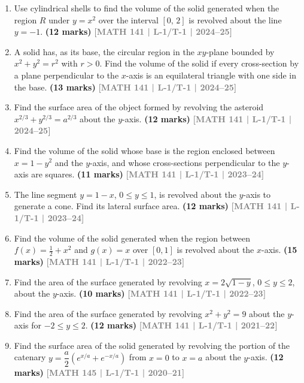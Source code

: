 \documentclass[12pt,a3paper]{article}
\newcommand{\yr}[1]{\hfill\textcolor{gray}{\small\textbf{[#1]}}}
\newcommand{\mk}[1]{\textcolor{orange!70!black}{\small\textbf{(#1 marks)}}}
\begin{document}
\begin{enumerate}

\item Use cylindrical shells to find the volume of the solid generated when the region $R$ under $y=x^{2}$ over the interval $[0,\,2]$ is revolved about the line $y=-1$. 
\mk{12} \yr{MATH 141 | L-1/T-1 | 2024--25}

\item A solid has, as its base, the circular region in the $xy$-plane bounded by $x^{2}+y^{2}=r^{2}$ with $r>0$. Find the volume of the solid if every cross-section by a plane perpendicular to the $x$-axis is an equilateral triangle with one side in the base.
\mk{13}  \yr{MATH 141 | L-1/T-1 | 2024--25}  

\item Find the surface area of the object formed by revolving the asteroid $x^{2/3}+y^{2/3}=a^{2/3}$ about the $y$-axis. 
\mk{12} \yr{MATH 141 | L-1/T-1 | 2024--25}

\item Find the volume of the solid whose base is the region enclosed between $x=1-y^{2}$ and the $y$-axis, and whose cross-sections perpendicular to the $y$-axis are squares.
\mk{11} \yr{MATH 141 | L-1/T-1 | 2023--24}

\item The line segment $y=1-x$, $0\le y\le 1$, is revolved about the $y$-axis to generate a cone. Find its lateral surface area.
\mk{12} \yr{MATH 141 | L-1/T-1 | 2023--24}

\item Find the volume of the solid generated when the region between $f(x)=\tfrac{1}{2}+x^{2}$ and $g(x)=x$ over $[0,1]$ is revolved about the $x$-axis.
\mk{15} \yr{MATH 141 | L-1/T-1 | 2022--23}

\item Find the area of the surface generated by revolving $x=2\sqrt{1-y}$, $0\le y\le 2$, about the $y$-axis.
\mk{10} \yr{MATH 141 | L-1/T-1 | 2022--23}

\item Find the area of the surface generated by revolving $x^{2}+y^{2}=9$ about the $y$-axis for $-2\le y\le 2$.
\mk{12} \yr{MATH 141 | L-1/T-1 | 2021--22}

\item Find the surface area of the solid generated by revolving the portion of the catenary $y=\dfrac{a}{2}(e^{x/a}+e^{-x/a})$ from $x=0$ to $x=a$ about the $y$-axis.
\mk{12} \yr{MATH 145 | L-1/T-1 | 2020--21}


\end{enumerate}
\end{document}
